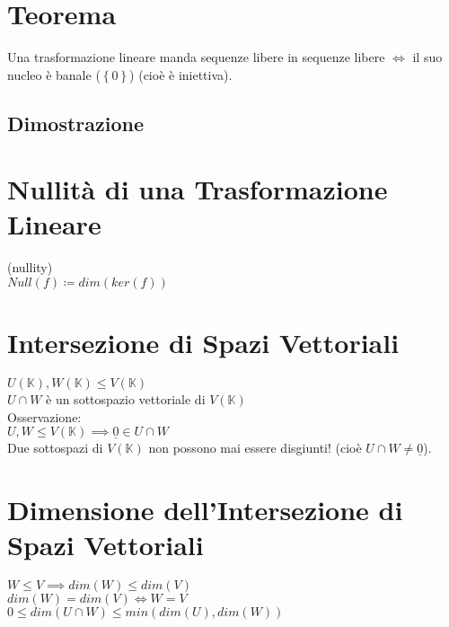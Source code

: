 \documentclass[a4paper, twoside, italian, 11pt]{book}
\newcommand{\braces}[1] {\left \{ #1 \right \}}
\newcommand{\K}{\mathbb K}
\begin{document}
\section{Teorema}

Una trasformazione lineare manda sequenze libere in sequenze libere $\iff$ il suo nucleo è banale ($\braces{0}$) (cioè è iniettiva).


\subsection{Dimostrazione}




\section{Nullità di una Trasformazione Lineare}

(nullity) \\

\noindent
$Null(f) \coloneqq dim(ker(f))$



\section{Intersezione di Spazi Vettoriali}

$U(\K), W(\K) \leq V(\K)$ \\

\noindent
$U \cap W$ è un sottospazio vettoriale di $V(\K)$ \\

\noindent
Osservazione: \\

\noindent
$U, W \leq V(\K) \implies \underline 0 \in U \cap W$ \\
Due sottospazi di $V(\K)$ non possono mai essere disgiunti! (cioè $U \cap W \neq \underline 0$).



\section{Dimensione dell'Intersezione di Spazi Vettoriali}

$W \leq V \implies dim(W) \leq dim(V)$ \\
$dim(W) = dim(V) \iff W = V$ \\

\noindent
$0 \leq dim(U \cap W) \leq min(dim(U), dim(W))$
\end{document}
